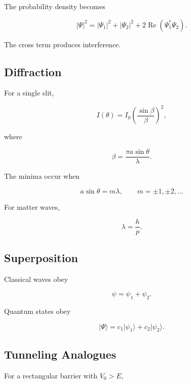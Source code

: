 \documentclass[12pt]{article}
\begin{document}
The probability density becomes

\begin{equation}
|\Psi|^2
=
|\Psi_1|^2
+
|\Psi_2|^2
+
2\operatorname{Re}(\Psi_1^*\Psi_2).
\end{equation}

The cross term produces interference.

\subsection{Diffraction}

For a single slit,

\begin{equation}
I(\theta)
=
I_0
\left(
\frac{\sin\beta}{\beta}
\right)^2,
\end{equation}

where

\begin{equation}
\beta=\frac{\pi a\sin\theta}{\lambda}.
\end{equation}

The minima occur when

\begin{equation}
a\sin\theta=m\lambda,
\qquad
m=\pm1,\pm2,\ldots
\end{equation}

For matter waves,

\begin{equation}
\lambda=\frac{h}{p}.
\end{equation}

\subsection{Superposition}

Classical waves obey

\begin{equation}
\psi=\psi_1+\psi_2.
\end{equation}

Quantum states obey

\begin{equation}
|\Psi\rangle
=
c_1|\psi_1\rangle
+
c_2|\psi_2\rangle.
\end{equation}

\subsection{Tunneling Analogues}

For a rectangular barrier with $V_0>E$,
\end{document}
